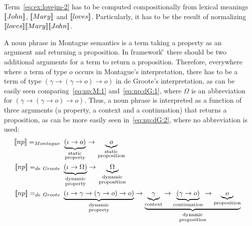 Term~\eqref{eq:ex:lovejm-2} has to be computed compositionally from lexical meanings $[\![John]\!]$, $[\![Mary]\!]$ and $[\![loves]\!]$. Particularly, it has to be the result of normalizing  $[\![loves]\!] [\![Mary]\!] [\![John]\!]$.

A noun phrase in Montague semantics is a term taking a property as an argument and returning a proposition.  In framework {\G} there should be two additional arguments for a term to return a proposition. Therefore, everywhere where a term of type $o$ occurs in Montague's interpretation, there has to be a term of type $(\gamma \rightarrow (\gamma \rightarrow o) \rightarrow o)$ in de Groote's interpretation, as can be easily seen comparing~\eqref{eq:np:M:1} and~\eqref{eq:np:dG:1}, where $\Omega$ is an abbreviation for $(\gamma \rightarrow (\gamma \rightarrow o) \rightarrow o)$. Thus, a noun phrase is interpreted as a function of three arguments (a property, a context and a continuation) that returns a proposition, as can be more easily seen in~\eqref{eq:np:dG:2}, where no abbreviation is used:
\begin{subequations}
\begin{align}
\I{np} =_{Montague} \ & \underbrace{(\iota \rightarrow   o)}_{
\begin{smallmatrix}
\text{static}\\
\text{property}
\end{smallmatrix}} \rightarrow \underbrace{o}_{\begin{smallmatrix}
\text{static}\\
\text{proposition}
\end{smallmatrix}} \label{eq:np:M:1} \\
\I{np} =_{de~Groote} \ & \underbrace{(\iota \rightarrow  \Omega )}_{\begin{smallmatrix}
\text{dynamic}\\
\text{property}
\end{smallmatrix}} \rightarrow \underbrace{\Omega}_{
\begin{smallmatrix}
\text{dynamic}\\
\text{proposition}
\end{smallmatrix}} \label{eq:np:dG:1} \\
\I{np} =_{de~Groote} \ & \underbrace{(\iota \rightarrow \gamma \rightarrow (\gamma \rightarrow o) \rightarrow o)}_{
\begin{smallmatrix}
\text{dynamic}\\
\text{property}
\end{smallmatrix}} \rightarrow \underbrace{\underbrace{\gamma}_{\text{context}} \rightarrow \underbrace{(\gamma \rightarrow o)}_{\text{continuation}} \rightarrow \underbrace{o}_{\text{proposition}}}_{\begin{smallmatrix}
\text{dynamic}\\
\text{proposition}
\end{smallmatrix}} \label{eq:np:dG:2}
\end{align}
\label{eq:np:MdG}
\end{subequations}

